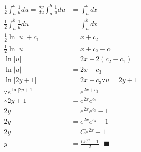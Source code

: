 \documentclass[10pt,a4paper,fleqn]{article}
\begin{document}
  \begin{align}
    \frac{1}{2} \int_a^b \frac{1}{u} du = \frac{dy}{du} \int_a^b \frac{1}{u} du &= \int_a^b dx \\
    \frac{1}{2} \int_a^b \frac{1}{u} du &= \int_a^b dx \\
    \frac{1}{2} \ln|u| + c_1 &= x + c_2 \\
    \frac{1}{2} \ln|u| &= x + c_2 - c_1 \\
    \ln|u| &= 2 x + 2 (c_2 - c_1) \\
    \ln|u| &= 2 x + c_3 \\
    \ln|2y+1| &= 2 x + c_3 \because u = 2y+1 \\
    \because e^{\ln|2y+1|} &= e^{2 x + c_3} \\
    \therefore 2y+1 &= e^{2x}e^{c_3} \\
    2y &= e^{2x}e^{c_3} - 1 \\
    2y &= e^{2x}e^{c_3} - 1 \\
    2y &= C e^{2x} - 1 \\
    y  &= \frac{C e^{2x} - 1}{2} \ \ \ \blacksquare
  \end{align}
\end{document}
